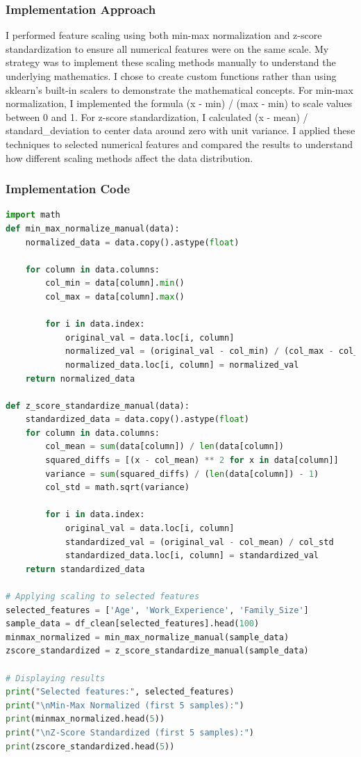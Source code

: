 \documentclass[12pt,a4paper]{article}
\begin{document}
\subsubsection{Implementation Approach}
I performed feature scaling using both min-max normalization and z-score standardization to ensure all numerical features were on the same scale. My strategy was to implement these scaling methods manually to understand the underlying mathematics. I chose to create custom functions rather than using sklearn's built-in scalers to demonstrate the mathematical concepts. For min-max normalization, I implemented the formula (x - min) / (max - min) to scale values between 0 and 1. For z-score standardization, I calculated (x - mean) / standard\_deviation to center data around zero with unit variance. I applied these techniques to selected numerical features and compared the results to understand how different scaling methods affect the data distribution.

\subsubsection{Implementation Code}
\begin{lstlisting}[language=Python, caption=Feature Scaling - Min-Max Normalization and Z-Score Standardization]
import math
def min_max_normalize_manual(data):
    normalized_data = data.copy().astype(float)
    
    for column in data.columns:
        col_min = data[column].min()
        col_max = data[column].max()
        
        for i in data.index:
            original_val = data.loc[i, column]
            normalized_val = (original_val - col_min) / (col_max - col_min)
            normalized_data.loc[i, column] = normalized_val
    return normalized_data

def z_score_standardize_manual(data):
    standardized_data = data.copy().astype(float)
    for column in data.columns:
        col_mean = sum(data[column]) / len(data[column])
        squared_diffs = [(x - col_mean) ** 2 for x in data[column]]
        variance = sum(squared_diffs) / (len(data[column]) - 1)
        col_std = math.sqrt(variance)
    
        for i in data.index:
            original_val = data.loc[i, column]
            standardized_val = (original_val - col_mean) / col_std
            standardized_data.loc[i, column] = standardized_val
    return standardized_data

# Applying scaling to selected features
selected_features = ['Age', 'Work_Experience', 'Family_Size'] 
sample_data = df_clean[selected_features].head(100)
minmax_normalized = min_max_normalize_manual(sample_data)
zscore_standardized = z_score_standardize_manual(sample_data)

# Displaying results
print("Selected features:", selected_features)
print("\nMin-Max Normalized (first 5 samples):")
print(minmax_normalized.head(5))
print("\nZ-Score Standardized (first 5 samples):")
print(zscore_standardized.head(5))
\end{lstlisting}
\end{document}
